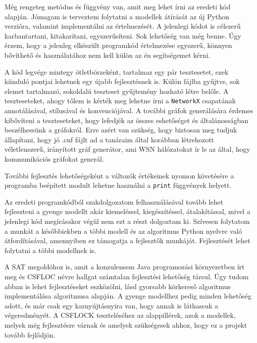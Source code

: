 \documentclass[
]{thesis-ekf}
\theoremstyle{definition}
\theoremstyle{remark}
\begin{document}
	Még rengeteg metódus és függvény van, amit meg lehet írni az eredeti kód \cite{github-py08} alapján. Jómagam is terveztem folytatni a modellek átírását az új Python verzióra, valamint implementálni az értelmezését. A jelenlegi kódot is célszerű karbantartani, kitakarítani, egyszerűsíteni. Sok lehetőség van még benne. Úgy érzem, hogy a jelenleg elkészült programkód értelmezése egyszerű, könnyen bővíthető és használatához nem kell külön az én segítségemet kérni.
	
	A kód legvége mintegy ötletbörzeként, tartalmaz egy pár tesztesetet, ezek kiinduló pontjai lehetnek egy újabb fejlesztésnek is. Külön fájlba gyűjtve, sok elemet tartalmazó, sokoldalú teszteset gyűjtemény hozható létre belőle. A teszteseteket, ahogy tőlem is kérték meg lehetne írni a \texttt{NetworkX} csapatának annotálásával, stílusával és konvenciójával. A további gráfok generálására érdemes kibővíteni a teszteseteket, hogy lefedjék az összes eshetőséget és általánosságban beszélhessünk a gráfokról. Erre azért van szükség, hogy biztosan meg tudjuk állapítani, hogy jó .cnf fájlt ad a tanáraim által korábban létrehozott véletlenszerű, irányított gráf generátor, ami \textsc{WSN} hálózatokat \cite{am} ír le az által, hogy kommunikációs gráfokat generál.
	
	További fejlesztés lehetőségeként a változók értékeinek nyomon követésére a programba beépített modult lehetne használni a \texttt{print} függvények helyett.
	
	Az eredeti programkódból szakdolgozatom felhasználásával tovább lehet fejleszteni a gyenge modellt akár kiemeléssel, kiegészítéssel, átalakítással, mivel a jelenlegi kód megírásakor végül nem ezt a részt dolgoztam ki. Szívesen folytatom a munkát a későbbiekben a többi modell és az algoritmus Python nyelvre való átfordításával, amennyiben ez támogatja a fejlesztők munkáját. Fejlesztését lehet folytatni a többi modellnek is.

	A \textsc{SAT} megoldóhoz is, amit a konzulensem Java programozási környezetben írt meg és \textsc{CSFLOC} névre hallgat számtalan fejlesztési lehetőség társul. Úgy tudom abban is lehet fejlesztéseket eszközölni, lásd gyorsabb körkereső algoritmus implementálása \cite[Johnson]{johnson} algoritmusa alapján. A gyenge modellhez pedig minden lehetőség adott, és már csak egy karnyújtásnyira van, hogy annak is láthassuk a végeredményét.	A \textsc{CSFLOCK} teszteléséhez az alappillérek, azok a modellek, melyek még fejlesztésre várnak és amelyek szükségesek ahhoz, hogy ez a projekt tovább fejlődjön.
	
\end{document}
